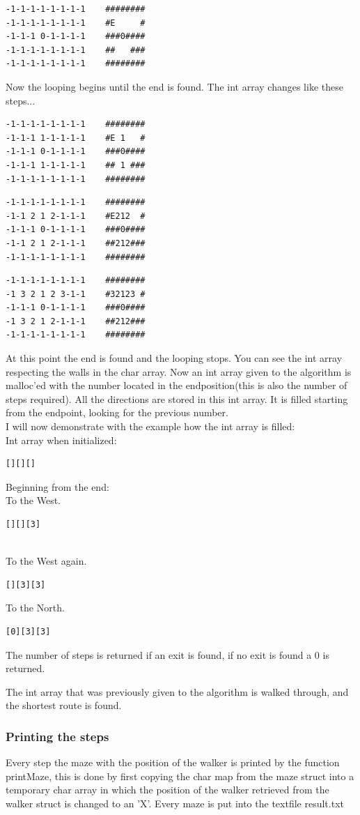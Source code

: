 \documentclass[pdftex,12pt,a4paper]{article}
\begin{document}
\begin{verbatim}
-1-1-1-1-1-1-1-1    ########
-1-1-1-1-1-1-1-1    #E     #
-1-1-1 0-1-1-1-1    ###0####
-1-1-1-1-1-1-1-1    ##   ###
-1-1-1-1-1-1-1-1    ########
\end{verbatim}
Now the looping begins until the end is found. The int array changes like these steps...

\begin{verbatim}
-1-1-1-1-1-1-1-1    ########
-1-1-1 1-1-1-1-1    #E 1   #
-1-1-1 0-1-1-1-1    ###0####
-1-1-1 1-1-1-1-1    ## 1 ###
-1-1-1-1-1-1-1-1    ########
\end{verbatim}

\begin{verbatim}
-1-1-1-1-1-1-1-1    ########
-1-1 2 1 2-1-1-1    #E212  #
-1-1-1 0-1-1-1-1    ###0####
-1-1 2 1 2-1-1-1    ##212###
-1-1-1-1-1-1-1-1    ########
\end{verbatim}

\begin{verbatim}
-1-1-1-1-1-1-1-1    ########
-1 3 2 1 2 3-1-1    #32123 #
-1-1-1 0-1-1-1-1    ###0####
-1 3 2 1 2-1-1-1    ##212###
-1-1-1-1-1-1-1-1    ########
\end{verbatim}
At this point the end is found and the looping stops.
You can see the int array respecting the walls in the char array.
Now an int array given to the algorithm is malloc'ed with the number located in the endposition(this is also the number of steps required). All the directions are stored in this int array. It is filled starting from the endpoint, looking for the previous number.\\
\pagebreak 
I will now demonstrate with the example how the int array is filled:\\
Int array when initialized:
\begin{verbatim}
[][][]
\end{verbatim}
Beginning from the end:\\
To the West.
\begin{verbatim}
[][][3]
\end{verbatim}\\
To the West again.
\begin{verbatim}
[][3][3]
\end{verbatim}

To the North.
\begin{verbatim}
[0][3][3]
\end{verbatim}
The number of steps is returned if an exit is found, if no exit is found a 0 is returned.

The int array that was previously given to the algorithm is walked through, and the shortest route is found.

\subsubsection{Printing the steps}
Every step the maze with the position of the walker is printed by the function printMaze, this is done by first copying the char map from the maze struct into a temporary char array in which the position of the walker retrieved from the walker struct is changed to an 'X'. Every maze is put into the textfile result.txt
\end{document}
